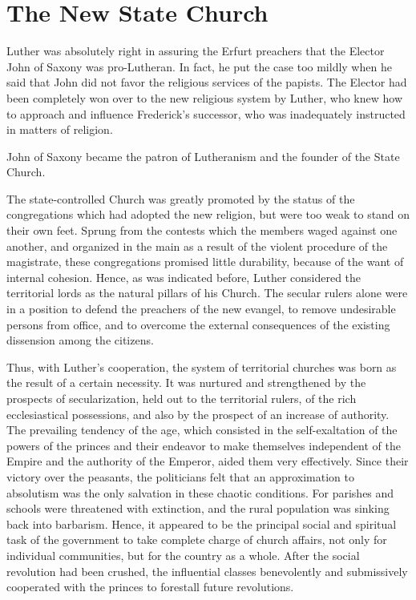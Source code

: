 \section{The New State Church}

Luther was absolutely right in assuring the Erfurt preachers that
the Elector John of Saxony was pro-Lutheran. In fact, he put the
case too mildly when he said that John did not favor the religious
services of the papists. The Elector had been completely won over
to the new religious system by Luther, who knew how to approach
and influence Frederick’s successor, who was inadequately instructed
in matters of religion.

John of Saxony became the patron of Lutheranism and the founder
of the State Church.

The state-controlled Church was greatly promoted by the status
of the congregations which had adopted the new religion, but were
too weak to stand on their own feet. Sprung from the contests
which the members waged against one another, and organized in
the main as a result of the violent procedure of the magistrate, these
congregations promised little durability, because of the want of internal
cohesion. Hence, as was indicated before, Luther considered
the territorial lords as the natural pillars of his Church. The secular
rulers alone were in a position to defend the preachers of the new
evangel, to remove undesirable persons from office, and to overcome
the external consequences of the existing dissension among the
citizens.

Thus, with Luther’s cooperation, the system of territorial churches
was born as the result of a certain necessity. It was nurtured and
strengthened by the prospects of secularization, held out to the territorial
rulers, of the rich ecclesiastical possessions, and also by the
prospect of an increase of authority. The prevailing tendency of
the age, which consisted in the self-exaltation of the powers of
the princes and their endeavor to make themselves independent of
the Empire and the authority of the Emperor, aided them very
effectively. Since their victory over the peasants, the politicians felt
that an approximation to absolutism was the only salvation in
these chaotic conditions. For parishes and schools were threatened
with extinction, and the rural population was sinking back into
barbarism. Hence, it appeared to be the principal social and spiritual
task of the government to take complete charge of church affairs,
not only for individual communities, but for the country as a whole.
After the social revolution had been crushed, the influential classes
benevolently and submissively cooperated with the princes to forestall
future revolutions.

